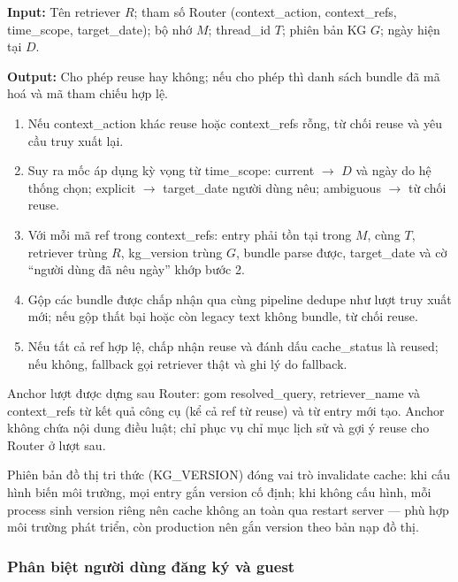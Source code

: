 \documentclass[../DoAn.tex]{subfiles}
\begin{document}
\begin{algorithm}[H]
\footnotesize
\textbf{Input:} Tên retriever $R$; tham số Router (context\_action, context\_refs, time\_scope, target\_date); bộ nhớ $M$; thread\_id $T$; phiên bản KG $G$; ngày hiện tại $D$.

\textbf{Output:} Cho phép reuse hay không; nếu cho phép thì danh sách bundle đã mã hoá và mã tham chiếu hợp lệ.

\begin{enumerate}[label=\textbf{Bước \arabic*.}, leftmargin=1.6cm]
    \item Nếu context\_action khác reuse hoặc context\_refs rỗng, từ chối reuse và yêu cầu truy xuất lại.
    \item Suy ra mốc áp dụng kỳ vọng từ time\_scope: current $\rightarrow$ $D$ và ngày do hệ thống chọn; explicit $\rightarrow$ target\_date người dùng nêu; ambiguous $\rightarrow$ từ chối reuse.
    \item Với mỗi mã ref trong context\_refs: entry phải tồn tại trong $M$, cùng $T$, retriever trùng $R$, kg\_version trùng $G$, bundle parse được, target\_date và cờ ``người dùng đã nêu ngày'' khớp bước 2.
    \item Gộp các bundle được chấp nhận qua cùng pipeline dedupe như lượt truy xuất mới; nếu gộp thất bại hoặc còn legacy text không bundle, từ chối reuse.
    \item Nếu tất cả ref hợp lệ, chấp nhận reuse và đánh dấu cache\_status là reused; nếu không, fallback gọi retriever thật và ghi lý do fallback.
\end{enumerate}
\caption{Giải thuật kiểm tra tái sử dụng ngữ cảnh truy xuất}
\label{algo:validate_reuse}
\end{algorithm}

Anchor lượt được dựng sau Router: gom resolved\_query, retriever\_name và context\_refs từ kết quả công cụ (kể cả ref từ reuse) và từ entry mới tạo. Anchor không chứa nội dung điều luật; chỉ phục vụ chỉ mục lịch sử và gợi ý reuse cho Router ở lượt sau.

Phiên bản đồ thị tri thức (KG\_VERSION) đóng vai trò invalidate cache: khi cấu hình biến môi trường, mọi entry gắn version cố định; khi không cấu hình, mỗi process sinh version riêng nên cache không an toàn qua restart server --- phù hợp môi trường phát triển, còn production nên gắn version theo bản nạp đồ thị.

\subsubsection{Phân biệt người dùng đăng ký và guest}
\end{document}
